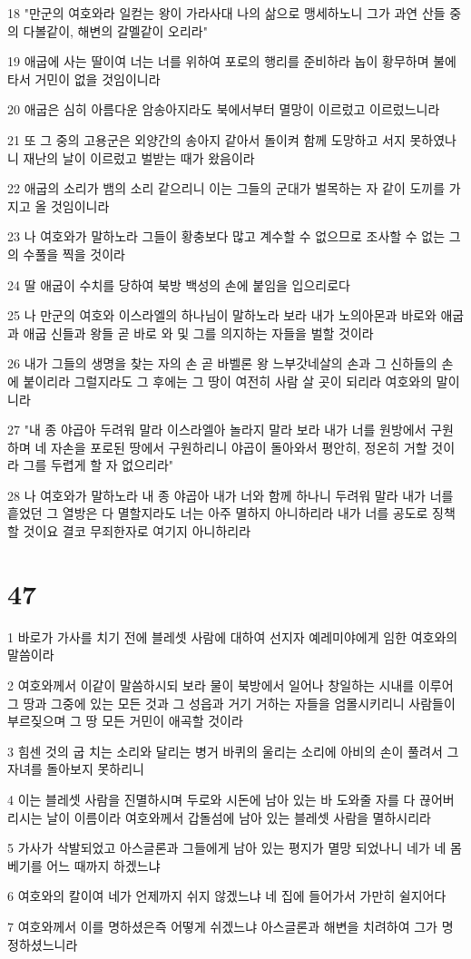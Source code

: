 \par 18 "만군의 여호와라 일컫는 왕이 가라사대 나의 삶으로 맹세하노니 그가 과연 산들 중의 다볼같이, 해변의 갈멜같이 오리라"
\par 19 애굽에 사는 딸이여 너는 너를 위하여 포로의 행리를 준비하라 놉이 황무하며 불에 타서 거민이 없을 것임이니라
\par 20 애굽은 심히 아름다운 암송아지라도 북에서부터 멸망이 이르렀고 이르렀느니라
\par 21 또 그 중의 고용군은 외양간의 송아지 같아서 돌이켜 함께 도망하고 서지 못하였나니 재난의 날이 이르렀고 벌받는 때가 왔음이라
\par 22 애굽의 소리가 뱀의 소리 같으리니 이는 그들의 군대가 벌목하는 자 같이 도끼를 가지고 올 것임이니라
\par 23 나 여호와가 말하노라 그들이 황충보다 많고 계수할 수 없으므로 조사할 수 없는 그의 수풀을 찍을 것이라
\par 24 딸 애굽이 수치를 당하여 북방 백성의 손에 붙임을 입으리로다
\par 25 나 만군의 여호와 이스라엘의 하나님이 말하노라 보라 내가 노의아몬과 바로와 애굽과 애굽 신들과 왕들 곧 바로 와 및 그를 의지하는 자들을 벌할 것이라
\par 26 내가 그들의 생명을 찾는 자의 손 곧 바벨론 왕 느부갓네살의 손과 그 신하들의 손에 붙이리라 그럴지라도 그 후에는 그 땅이 여전히 사람 살 곳이 되리라 여호와의 말이니라
\par 27 "내 종 야곱아 두려워 말라 이스라엘아 놀라지 말라 보라 내가 너를 원방에서 구원하며 네 자손을 포로된 땅에서 구원하리니 야곱이 돌아와서 평안히, 정온히 거할 것이라 그를 두렵게 할 자 없으리라"
\par 28 나 여호와가 말하노라 내 종 야곱아 내가 너와 함께 하나니 두려워 말라 내가 너를 흩었던 그 열방은 다 멸할지라도 너는 아주 멸하지 아니하리라 내가 너를 공도로 징책할 것이요 결코 무죄한자로 여기지 아니하리라

\chapter{47}

\par 1 바로가 가사를 치기 전에 블레셋 사람에 대하여 선지자 예레미야에게 임한 여호와의 말씀이라
\par 2 여호와께서 이같이 말씀하시되 보라 물이 북방에서 일어나 창일하는 시내를 이루어 그 땅과 그중에 있는 모든 것과 그 성읍과 거기 거하는 자들을 엄몰시키리니 사람들이 부르짖으며 그 땅 모든 거민이 애곡할 것이라
\par 3 힘센 것의 굽 치는 소리와 달리는 병거 바퀴의 울리는 소리에 아비의 손이 풀려서 그 자녀를 돌아보지 못하리니
\par 4 이는 블레셋 사람을 진멸하시며 두로와 시돈에 남아 있는 바 도와줄 자를 다 끊어버리시는 날이 이름이라 여호와께서 갑돌섬에 남아 있는 블레셋 사람을 멸하시리라
\par 5 가사가 삭발되었고 아스글론과 그들에게 남아 있는 평지가 멸망 되었나니 네가 네 몸 베기를 어느 때까지 하겠느냐
\par 6 여호와의 칼이여 네가 언제까지 쉬지 않겠느냐 네 집에 들어가서 가만히 쉴지어다
\par 7 여호와께서 이를 명하셨은즉 어떻게 쉬겠느냐 아스글론과 해변을 치려하여 그가 명정하셨느니라

